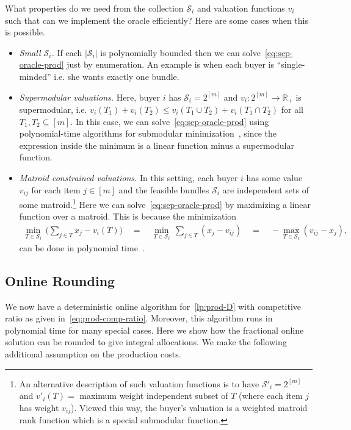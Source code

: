 \documentclass[letterpaper,11pt]{article}
\def \RR   {{\mathbb R}}
\def\cS{\mathcal{S}}
\def\sse{\subseteq}
\begin{document}
What properties do we need from the collection $\cS_i$ and valuation
functions $v_i$ such that can we implement the oracle efficiently? Here
are some cases when this is possible.
\begin{itemize}
\item \emph{Small $\cS_i$.} If each $|\cS_i|$ is polynomially bounded then we can
  solve~\eqref{eq:sep-oracle-prod} just by enumeration. An example is when each buyer is ``single-minded'' i.e. she wants exactly one bundle.

\item {\em Supermodular valuations.} Here, buyer $i$ has $\cS_i=2^{[m]}$
  and $v_i:2^{[m]}\rightarrow \RR_+$ is supermodular,
  i.e. $v_i(T_1)+v_i(T_2) \le v_i(T_1\cup T_2)+v_i(T_1\cap T_2)$ for all
  $T_1,T_2\sse [m]$. In this case, we can
  solve~\eqref{eq:sep-oracle-prod} using polynomial-time algorithms for
  submodular minimization~\cite{Schrijver-book}, since the expression inside the
  minimum is a linear function minus a supermodular function.

\item {\em Matroid constrained valuations.}  In this setting, each buyer
  $i$ has some value $v_{ij}$ for each item $j\in [m]$ and the feasible
  bundles $\cS_i$ are independent sets of some matroid.\footnote{An
    alternative description of such valuation functions is to have
    $\cS'_i=2^{[m]}$ and $v'_i(T) = $ maximum weight independent subset
    of $T$ (where each item $j$ has weight $v_{ij}$). Viewed this way,
    the buyer's valuation is a weighted matroid rank function which is a
    special submodular function.}  Here we can
  solve~\eqref{eq:sep-oracle-prod} by maximizing a linear function over
  a matroid. This is because the minimization
  \begin{gather*}
    \min_{T\in \cS_i} \, \bigg(\sum_{j\in T} x_j - v_i(T)\bigg) \quad =
    \quad \min_{T\in \cS_i} \, \sum_{j\in T} (x_j - v_{ij}) \quad =
    \quad -\max_{T\in \cS_i} (v_{ij}-x_j),
  \end{gather*}
  can be done in polynomial time~\cite{Schrijver-book}.
\end{itemize}


\subsection{Online Rounding}

We now have a deterministic online algorithm for~\eqref{lp:prod-D} with competitive ratio as given in~\eqref{eq:prod-comp-ratio}. Moreover, this algorithm runs in polynomial time for many special cases. Here we show how the fractional online solution can be rounded to give integral allocations. We make the following additional assumption on the production costs.
\end{document}
